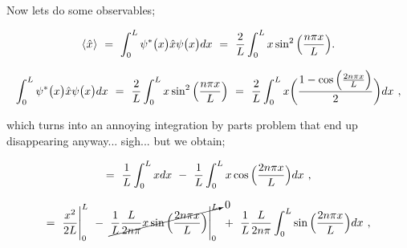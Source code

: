 \documentclass{article}
\begin{document}
Now lets do some observables;

\begin{equation} \label{eq:242}
\langle \hspace{0.0125cm} \hat{x} \hspace{0.0125cm} \rangle \hspace{0.125cm} = \hspace{0.125cm} \int_{0}^{L} \psi^{\ast}\big(x\big) \hat{x} \psi\big(x\big) dx \hspace{0.125cm} = \hspace{0.125cm} \frac{2}{L} \int_{0}^{L} x \sin^2\Big(\frac{n\pi x}{L}\Big) . 
\end{equation}

\begin{equation} \label{eq:243}
\int_{0}^{L} \psi^{\ast}\big(x\big) \hat{x} \psi\big(x\big) dx \hspace{0.125cm} = \hspace{0.125cm} \frac{2}{L} \int_{0}^{L} x \sin^2\Big(\frac{n\pi x}{L}\Big) \hspace{0.125cm} = \hspace{0.125cm}  \frac{2}{L} \int_{0}^{L} x \bigg( \frac{1 - \cos\Big(\frac{2n\pi x}{L}\Big)}{2} \bigg) dx \hspace{0.125cm} ,
\end{equation}

which turns into an annoying integration by parts problem that end up disappearing anyway... sigh... but we obtain;

\begin{equation} \label{eq:244}
= \hspace{0.125cm} \frac{1}{L} \int_{0}^{L} x dx \hspace{0.125cm} - \hspace{0.125cm} \frac{1}{L} \int_{0}^{L} x \cos\Big(\frac{2n\pi x}{L}\Big) dx \hspace{0.125cm} , 
\end{equation}

\begin{equation} \label{eq:245}
= \hspace{0.125cm} \frac{x^2}{2L} \Bigg|_{0}^{L} \hspace{0.125cm} - \hspace{0.125cm} 
\cancelto{0}{\frac{1}{L} \frac{L}{2n\pi} x \sin\Big(\frac{2n\pi x}{L}\Big) \Bigg|_{0}^{L}} \hspace{0.125cm} + \hspace{0.125cm} \frac{1}{L} \frac{L}{2n\pi} \int_{0}^{L} \sin\Big(\frac{2n\pi x}{L}\Big) dx \hspace{0.125cm} ,
\end{equation}
\end{document}
